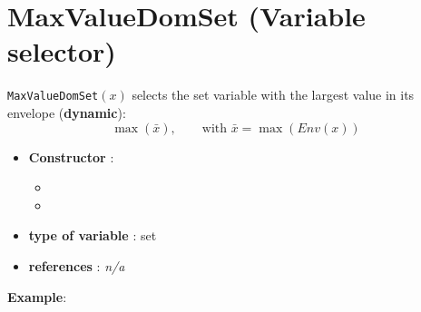 \section{MaxValueDomSet (Variable selector)}\label{maxvaldomset:maxvaldomsetvarselector}\hypertarget{maxvaldomset:maxvaldomsetvarselector}{}
\begin{notedef}
  \texttt{MaxValueDomSet}$(x)$ selects the set variable with the largest value in its envelope (\textbf{dynamic}):
$$\max(\bar{x}),\qquad\text{with } \bar{x}=\max(Env(x))$$
\end{notedef}

\begin{itemize}
	\item \textbf{Constructor} : 
	\begin{itemize}
	\item {}
	\item {}
	\end{itemize}	
	\item \textbf{type of variable} : set
	\item \textbf{references} : \emph{n/a}
\end{itemize}

\textbf{Example}:
%

